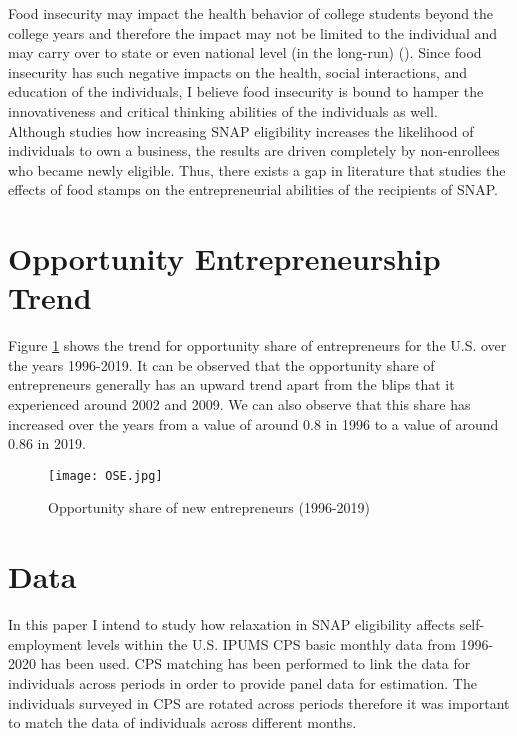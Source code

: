 \documentclass[12pt]{article}
\begin{document}
\begin{titlingpage}
Food insecurity may impact the health behavior of college students beyond the college years and therefore the impact may not be limited to the individual and may carry over to state or even national level (in the long-run) (\cite{el2019prevalence}). Since food insecurity has such negative impacts on the health, social interactions, and education of the individuals, I believe food insecurity is bound to hamper the innovativeness and critical thinking abilities of the individuals as well.  \\

Although \cite{olds2016food} studies how increasing SNAP eligibility increases the likelihood of individuals to own a business, the results are driven completely by non-enrollees who became newly eligible. Thus, there exists a gap in literature that studies the effects of food stamps on the entrepreneurial abilities of the recipients of SNAP. \\



\section*{Opportunity Entrepreneurship Trend}

Figure \ref{fig:ose} shows the trend for opportunity share of entrepreneurs for the U.S. over the years 1996-2019. It can be observed that the opportunity share of entrepreneurs generally has an upward trend apart from the blips that it experienced around 2002 and 2009. We can also observe that this share has increased over the years from a value of around 0.8 in 1996 to a value of around 0.86 in 2019. \\  

\begin{figure}[H]
    \centering
    \texttt{[image: OSE.jpg]}
    \caption{Opportunity share of new entrepreneurs (1996-2019)}
    \label{fig:ose}
\end{figure}








\section*{Data}

In this paper I intend to study how relaxation in SNAP eligibility affects self-employment levels within the U.S. IPUMS CPS basic monthly data from 1996-2020 has been used. CPS matching has been performed to link the data for individuals across periods in order to provide panel data for estimation. The individuals surveyed in CPS are rotated across periods therefore it was important to match the data of individuals across different months.     \\



\end{titlingpage}
\end{document}
